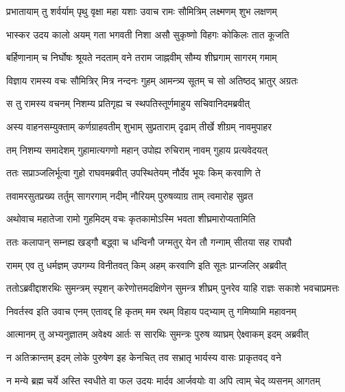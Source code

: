 
\twolineshloka
{प्रभातायाम् तु शर्वर्याम् पृथु वृक्षा महा यशाः}
{उवाच रामः सौमित्रिम् लक्ष्मणम् शुभ लक्षणम्} %

\twolineshloka
{भास्कर उदय कालो अयम् गता भगवती निशा}
{असौ सुकृष्णो विहगः कोकिलः तात कूजति} %

\twolineshloka
{बर्हिणानाम् च निर्घोषः श्रूयते नदताम् वने}
{तराम जाह्नवीम् सौम्य शीघ्रगाम् सागरम् गमाम्} %

\twolineshloka
{विज्ञाय रामस्य वचः सौमित्रिर् मित्र नन्दनः}
{गुहम् आमन्त्र्य सूतम् च सो अतिष्ठद् भ्रातुर् अग्रतः} %

\twolineshloka
{स तु रामस्य वचनम् निशम्य प्रतिगृह्य च}
{स्थपतिस्तूर्णमाहुय सचिवानिदमब्रवीत्} %

\twolineshloka
{अस्य वाहनसम्युक्ताम् कर्णग्राहवतीम् शुभाम्}
{सुप्रताराम् दृढाम् तीर्खे शीग्रम् नावमुपाहर} %

\twolineshloka
{तम् निशम्य समादेशम् गुहामात्यगणो महान्}
{उपोह्य रुचिराम् नावम् गुहाय प्रत्यवेदयत्} %

\twolineshloka
{ततः सप्राञ्जलिर्भूत्वा गुहो राघवमब्रवीत्}
{उपस्थितेयम् नौर्देव भूयः किम् करवाणि ते} %

\twolineshloka
{तवामरसुतप्रख्य तर्तुम् सागरगाम् नदीम्}
{नौरियम् पुरुषव्याग्र ताम् त्वमारोह सुव्रत} %

\twolineshloka
{अथोवाच महातेजा रामो गुहमिदम् वचः}
{कृतकामोऽस्मि भवता शीघ्रमारोप्यतामिति} %

\twolineshloka
{ततः कलापान् सम्नह्य खड्गौ बद्ध्वा च धन्विनौ}
{जग्मतुर् येन तौ गन्गाम् सीतया सह राघवौ} %

\twolineshloka
{रामम् एव तु धर्मज्ञम् उपगम्य विनीतवत्}
{किम् अहम् करवाणि इति सूतः प्रान्जलिर् अब्रवीत्} %

\fourlineindentedshloka
{ततोऽब्रवीद्दाशरथिः सुमन्त्रम्}
{स्पृशन् करेणोत्तमदक्षिणेन}
{सुमन्त्र शीघ्रम् पुनरेव याहि}
{राज्ञः सकाशे भवचाप्रमत्तः} %

\twolineshloka
{निवर्तस्व इति उवाच एनम् एतावद्द् हि कृतम् मम}
{रथम् विहाय पद्भ्याम् तु गमिष्यामि महावनम्} %

\twolineshloka
{आत्मानम् तु अभ्यनुज्ञातम् अवेक्ष्य आर्तः स सारथिः}
{सुमन्त्रः पुरुष व्याघ्रम् ऐक्ष्वाकम् इदम् अब्रवीत्} %

\twolineshloka
{न अतिक्रान्तम् इदम् लोके पुरुषेण इह केनचित्}
{तव सभ्रातृ भार्यस्य वासः प्राकृतवद् वने} %

\twolineshloka
{न मन्ये ब्रह्म चर्ये अस्ति स्वधीते वा फल उदयः}
{मार्दव आर्जवयोः वा अपि त्वाम् चेद् व्यसनम् आगतम्} %

